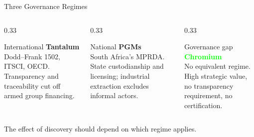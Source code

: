 \documentclass[aspectratio=169,11pt]{beamer}
\begin{document}
\begin{frame}{Three Governance Regimes}
  \begin{columns}[T]
    \begin{column}{0.33\textwidth}
      \begin{block}{International}
        \textcolor{sand}{\textbf{Tantalum}}\\[0.3em]
        {\small Dodd--Frank 1502, ITSCI, OECD. Transparency and traceability
        cut off armed group financing.}
      \end{block}
    \end{column}
    \begin{column}{0.33\textwidth}
      \begin{block}{National}
        \textcolor{sage}{\textbf{PGMs}}\\[0.3em]
        {\small South Africa's MPRDA. State custodianship and licensing;
        industrial extraction excludes informal actors.}
      \end{block}
    \end{column}
    \begin{column}{0.33\textwidth}
      \begin{block}{Governance gap}
        \textcolor{lime}{\textbf{Chromium}}\\[0.3em]
        {\small No equivalent regime. High strategic value, no transparency
        requirement, no certification.}
      \end{block}
    \end{column}
  \end{columns}
  \vspace{1em}
  \begin{center}
    {\color{sage}The effect of discovery should depend on which regime applies.}
  \end{center}
\end{frame}
\end{document}
